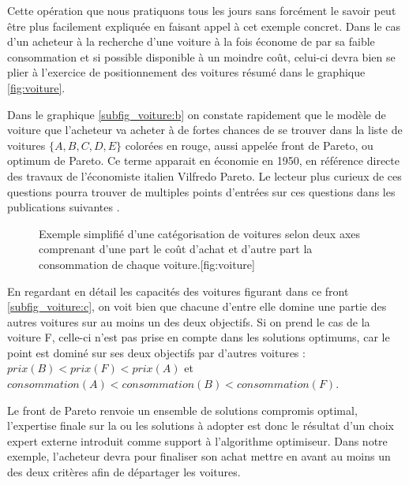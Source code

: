 Cette opération que nous pratiquons tous les jours sans forcément le savoir peut être plus facilement expliquée en faisant appel à cet exemple concret. Dans le cas d'un acheteur à la recherche d'une voiture à la fois économe de par sa faible consommation et si possible disponible à un moindre coût, celui-ci devra bien se plier à l'exercice de positionnement des voitures résumé dans le graphique \ref{fig:voiture}.

Dans le graphique \ref{subfig_voiture:b} on constate rapidement que le modèle de voiture que l'acheteur va acheter à de fortes chances de se trouver dans la liste de voitures $\{ A,B,C,D,E \}$ colorées en rouge, aussi appelée front de Pareto, ou optimum de Pareto. Ce terme apparait en économie en 1950, en référence directe des travaux de l'économiste italien Vilfredo Pareto. Le lecteur plus curieux de ces questions pourra trouver de multiples points d'entrées sur ces questions dans les publications suivantes \autocites{Ehrgott2012,Koksalan2011,Koksalan2013}.

\begin{figure}[!htbp]
	\begin{sidecaption}[fortoc]{Exemple simplifié d'une catégorisation de voitures selon deux axes comprenant d'une part le coût d'achat et d'autre part la consommation de chaque voiture.}[fig:voiture]
	\centering
	  \qquad
 \end{sidecaption}
\end{figure}

\sloppy En regardant en détail les capacités des voitures figurant dans ce front \ref{subfig_voiture:c}, on voit bien que chacune d'entre elle domine une partie des autres voitures sur au moins un des deux objectifs. Si on prend le cas de la voiture F, celle-ci n'est pas prise en compte dans les solutions optimums, car le point est dominé sur ses deux objectifs par d'autres voitures : $ prix(B) < prix(F) < prix(A) $ et $consommation(A) < consommation (B) < consommation(F)$.

Le front de Pareto renvoie un ensemble de solutions compromis optimal, l'expertise finale sur la ou les solutions à adopter est donc le résultat d'un choix expert externe introduit comme support à l'algorithme optimiseur. Dans notre exemple, l'acheteur devra pour finaliser son achat mettre en avant au moins un des deux critères afin de départager les voitures.

